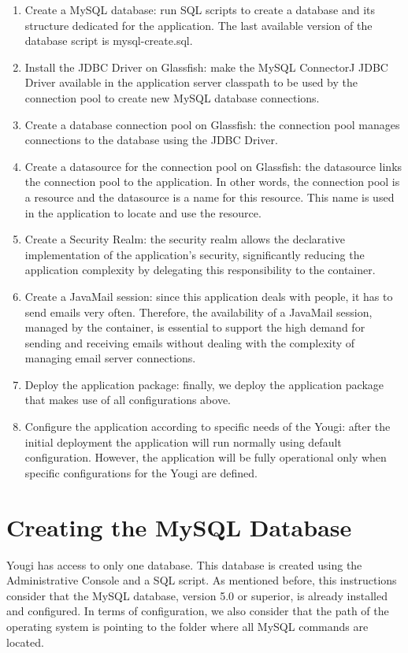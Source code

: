 \documentclass[envcountsame,envcountchap,letterpaper]{svmono}
\begin{document}
\begin{enumerate}
\item Create a MySQL database: run SQL scripts to create a database and its structure dedicated for the application. The last available version of the database script is mysql-create.sql.
\item Install the JDBC Driver on Glassfish: make the MySQL ConnectorJ JDBC Driver available in the application server classpath to be used by the connection pool to create new MySQL database connections.
\item Create a database connection pool on Glassfish: the connection pool manages connections to the database using the JDBC Driver.
\item Create a datasource for the connection pool on Glassfish: the datasource links the connection pool to the application. In other words, the connection pool is a resource and the datasource is a name for this resource. This name is used in the application to locate and use the resource.
\item Create a Security Realm: the security realm allows the declarative implementation of the application's security, significantly reducing the application complexity by delegating this responsibility to the container.
\item Create a JavaMail session: since this application deals with people, it has to send emails very often. Therefore, the availability of a JavaMail session, managed by the container, is essential to support the high demand for sending and receiving emails without dealing with the complexity of managing email server connections.
\item Deploy the application package: finally, we deploy the application package that makes use of all configurations above.
\item Configure the application according to specific needs of the Yougi: after the initial deployment the application will run normally using default configuration. However, the application will be fully operational only when specific configurations for the Yougi are defined.
\end{enumerate}

\section{Creating the MySQL Database}

Yougi has access to only one database. This database is created using the Administrative Console and a SQL script. As mentioned before, this instructions consider that the MySQL database, version 5.0 or superior, is already installed and configured. In terms of configuration, we also consider that the path of the operating system is pointing to the folder where all MySQL commands are located.
\end{document}
